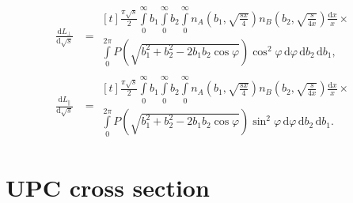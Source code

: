 \documentclass[a4paper,12pt]{article}
\begin{document}
\begin{equation}
  \begin{aligned}
    \frac{\mathrm{d} L_\perp }{\mathrm{d} \sqrt{s}}
    &= \begin{multlined}[t]
         \frac{\pi \sqrt{s}}{2}
         \int\limits_0^\infty
           b_1
           \int\limits_0^\infty
             b_2
             \int\limits_0^\infty
               n_A \left( b_1, \sqrt{\frac{sx}{4}} \right)
               n_B \left( b_2, \sqrt{\frac{s}{4x}} \right)
             \frac{\mathrm{d} x}{x}
      \times {} \\
             \int\limits_0^{2 \pi}
               P \left( \sqrt{b_1^2 + b_2^2 - 2 b_1 b_2 \cos \varphi} \right)
               \cos^2 \varphi
             \, \mathrm{d} \varphi
           \, \mathrm{d} b_2
         \, \mathrm{d} b_1,
       \end{multlined}
    \\
    \frac{\mathrm{d} L_\parallel }{\mathrm{d} \sqrt{s}}
    &= \begin{multlined}[t]
         \frac{\pi \sqrt{s}}{2}
         \int\limits_0^\infty
           b_1
           \int\limits_0^\infty
             b_2
             \int\limits_0^\infty
               n_A \left( b_1, \sqrt{\frac{sx}{4}} \right)
               n_B \left( b_2, \sqrt{\frac{s}{4x}} \right)
             \frac{\mathrm{d} x}{x}
      \times {} \\
             \int\limits_0^{2 \pi}
               P \left( \sqrt{b_1^2 + b_2^2 - 2 b_1 b_2 \cos \varphi} \right)
               \sin^2 \varphi
             \, \mathrm{d} \varphi
           \, \mathrm{d} b_2
         \, \mathrm{d} b_1.
       \end{multlined}
  \end{aligned}
\end{equation}

\section{UPC cross section}
\end{document}
